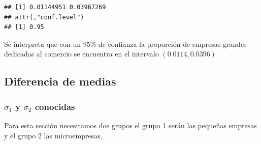 \documentclass[letterpaper,]{book}
\newenvironment{Shaded}{\begin{snugshade}}{\end{snugshade}}
\newcommand{\KeywordTok}[1]{\textcolor[rgb]{0.13,0.29,0.53}{\textbf{#1}}}
\newcommand{\NormalTok}[1]{#1}
\newcommand{\OperatorTok}[1]{\textcolor[rgb]{0.81,0.36,0.00}{\textbf{#1}}}
\newcommand{\StringTok}[1]{\textcolor[rgb]{0.31,0.60,0.02}{#1}}
\begin{document}
\begin{Shaded}
\end{Shaded}

\begin{verbatim}
## [1] 0.01144951 0.03967269
## attr(,"conf.level")
## [1] 0.95
\end{verbatim}

Se interpreta que con un \(95\%\) de confianza la proporción de empresas grandes dedicadas al comercio se encuentra en el intervalo \(\left(0.0114, 0.0396 \right)\)

\hypertarget{diferencia-de-medias}{%
\subsection{Diferencia de medias}\label{diferencia-de-medias}}

\hypertarget{sigma_1-y-sigma_2-conocidas}{%
\subsubsection{\texorpdfstring{\(\sigma_1\) y \(\sigma_2\) conocidas}{\textbackslash{}sigma\_1 y \textbackslash{}sigma\_2 conocidas}}\label{sigma_1-y-sigma_2-conocidas}}

Para esta sección necesitamos dos grupos el grupo 1 serán las pequeñas empresas y el grupo 2 las microempresas,

\begin{Shaded}
\end{Shaded}
\end{document}
